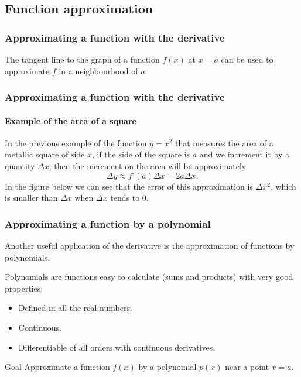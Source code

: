 \subsection{Function approximation}

\begin{frame}
\frametitle{Approximating a function with the derivative}
The tangent line to the graph of a function $f(x)$ at $x=a$ can be used to approximate $f$ in a neighbourhood of $a$.
\begin{center}

\end{center}
\end{frame}


\begin{frame}
\frametitle{Approximating a function with the derivative}
\framesubtitle{Example of the area of a square}
In the previous example of the function $y=x^2$ that measures the area of a metallic square of side $x$, if the side of the square is $a$ and we increment it by a quantity $\Delta x$, then the increment on the area will be approximately
\[
\Delta y \approx f'(a)\Delta x = 2a\Delta x.
\]
In the figure below we can see that the error of this approximation is $\Delta x^2$, which is smaller than $\Delta x$ when $\Delta x$ tends to 0. 
\begin{center}
\end{center}
\end{frame}


\begin{frame}
\frametitle{Approximating a function by a polynomial}
Another useful application of the derivative is the approximation of functions by polynomials.

Polynomials are functions easy to calculate (sums and products) with very good properties:
\begin{itemize}
\item Defined in all the real numbers.
\item Continuous.
\item Differentiable of all orders with continuous derivatives.
\end{itemize}

\begin{block}{Goal}
Approximate a function $f(x)$ by a polynomial $p(x)$ near a point $x=a$.
\end{block}
\end{frame}


